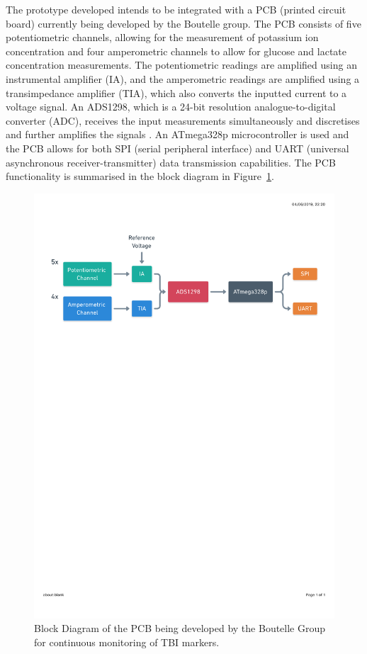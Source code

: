 The prototype developed intends to be integrated with a PCB (printed circuit board) currently being developed by the Boutelle group. The PCB consists of five potentiometric channels, allowing for the measurement of potassium ion concentration and four amperometric channels to allow for glucose and lactate concentration measurements. The potentiometric readings are amplified using an instrumental amplifier (IA), and the amperometric readings are amplified using a transimpedance amplifier (TIA), which also converts the inputted current to a voltage signal. An ADS1298, which is a 24-bit resolution analogue-to-digital converter (ADC), receives the input measurements simultaneously and discretises and further amplifies the signals \cite{TexasInstruments2010}. An ATmega328p microcontroller is used and the PCB allows for both SPI (serial peripheral interface) and UART (universal asynchronous receiver-transmitter) data transmission capabilities. The PCB functionality is summarised in the block diagram in Figure~\ref{fig: PCB block diagram}.

\begin{figure}[h!]
\centering
\includegraphics[trim={0cm 20.5cm 0.5cm  2.9cm}, clip, width=1\textwidth]{./figures/CircuitBlockDiagram.pdf}
\captionsetup{justification=centering}
\caption{Block Diagram of the PCB being developed by the Boutelle Group for continuous monitoring of TBI markers.}
\label{fig: PCB block diagram}
\end{figure}

